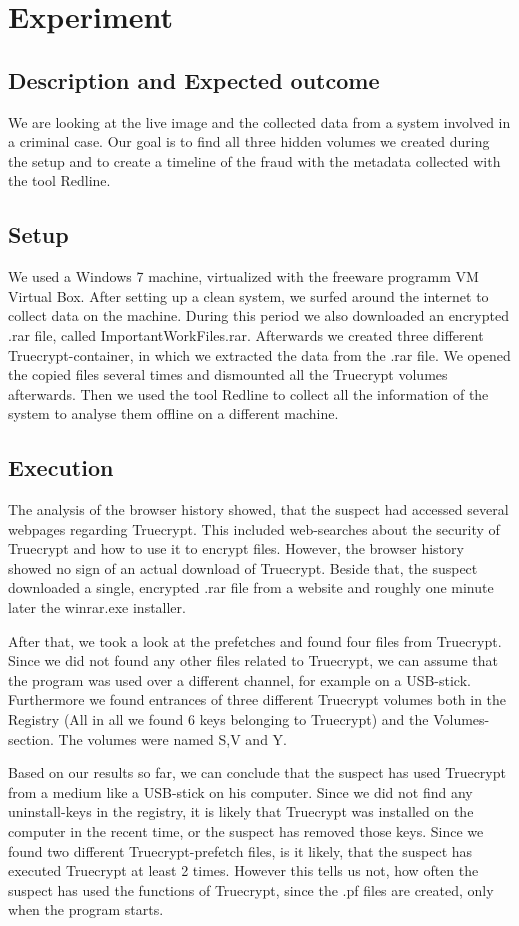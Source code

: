 \section{Experiment}
\subsection{Description and Expected outcome}
We are looking at the live image and the collected data from a system involved in a criminal case. Our goal is to find
all three hidden volumes we created during the setup and to create a timeline of the fraud with the metadata collected with
the tool Redline.

\subsection{Setup}
We used a Windows 7 machine, virtualized with the freeware programm VM Virtual Box. After setting up a clean system, we 
surfed around the internet to collect data on the machine. During this period we also downloaded an encrypted
.rar file, called ImportantWorkFiles.rar. Afterwards we created three different Truecrypt-container, in which we extracted
the data from the .rar file. We opened the copied files several times and dismounted all the Truecrypt volumes afterwards.
Then we used the tool Redline to collect all the information of the system to analyse them offline on a different
machine.
\subsection{Execution}
The analysis of the browser history showed, that the suspect had accessed several webpages regarding Truecrypt. This included web-searches about the security of Truecrypt and how to use it to encrypt files. However, the browser history showed no sign of an actual download of Truecrypt. Beside that, the suspect downloaded a single, encrypted .rar file from a website and roughly one minute later the winrar.exe installer.

After that, we took a look at the prefetches and found four files from Truecrypt. Since we did not found any other files related to Truecrypt, we can assume that the program was used over a different channel, for example on a USB-stick. Furthermore we found entrances of three different Truecrypt volumes both in the Registry (All in all we found 6 keys belonging to Truecrypt) and the Volumes-section. The volumes were named S,V and Y.

Based on our results so far, we can conclude that the suspect has used Truecrypt from a medium like a USB-stick on his computer. Since we did not find any uninstall-keys in the registry, it is likely that Truecrypt was installed on the computer in the recent time, or the suspect has removed those keys. Since we found two different Truecrypt-prefetch files, is it likely, that the suspect has executed Truecrypt at least 2 times. However this tells us not, how often the suspect has used the functions of Truecrypt, since the .pf files are created, only when the program starts.


